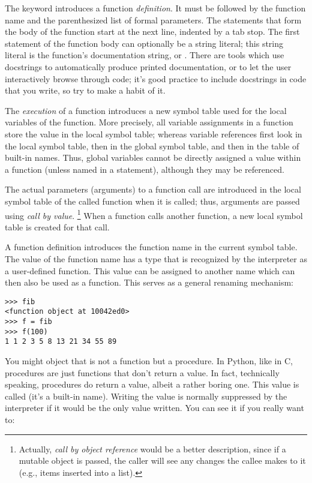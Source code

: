 \documentclass{manual}
\begin{document}
The keyword  introduces a function \emph{definition}.  It
must be followed by the function name and the parenthesized list of
formal parameters.  The statements that form the body of the function
start at the next line, indented by a tab stop.  The first statement
of the function body can optionally be a string literal; this string
literal is the function's documentation string, or .
There are tools which use docstrings to automatically produce printed
documentation, or to let the user interactively browse through code;
it's good practice to include docstrings in code that you write, so
try to make a habit of it.

The \emph{execution} of a function introduces a new symbol table used
for the local variables of the function.  More precisely, all variable
assignments in a function store the value in the local symbol table;
whereas variable references first look in the local symbol table, then
in the global symbol table, and then in the table of built-in names.
Thus,  global variables cannot be directly assigned a value within a
function (unless named in a  statement), although
they may be referenced.

The actual parameters (arguments) to a function call are introduced in
the local symbol table of the called function when it is called; thus,
arguments are passed using \emph{call by value}.%
\footnote{
         Actually, \emph{call by object reference} would be a better
         description, since if a mutable object is passed, the caller
         will see any changes the callee makes to it (e.g., items
         inserted into a list).
}
When a function calls another function, a new local symbol table is
created for that call.

A function definition introduces the function name in the current
symbol table.  The value of the function name
has a type that is recognized by the interpreter as a user-defined
function.  This value can be assigned to another name which can then
also be used as a function.  This serves as a general renaming
mechanism:

\begin{verbatim}
>>> fib
<function object at 10042ed0>
>>> f = fib
>>> f(100)
1 1 2 3 5 8 13 21 34 55 89
\end{verbatim}

You might object that  is not a function but a procedure.  In
Python, like in C, procedures are just functions that don't return a
value.  In fact, technically speaking, procedures do return a value,
albeit a rather boring one.  This value is called  (it's a
built-in name).  Writing the value  is normally suppressed by
the interpreter if it would be the only value written.  You can see it
if you really want to:
\end{document}
